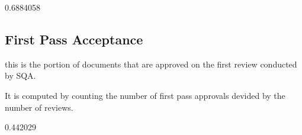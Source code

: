 \documentclass{article}
\begin{document}
\begin{Schunk}
\begin{Soutput}
[1] 0.6884058
\end{Soutput}
\end{Schunk}

\subsection{First Pass Acceptance}
this is the portion of documents that are approved on the first review conducted
by SQA.

It is computed by counting the number of first pass approvals devided by
the number of reviews.

\begin{Schunk}
\begin{Soutput}
[1] 0.442029
\end{Soutput}
\end{Schunk}
\end{document}
